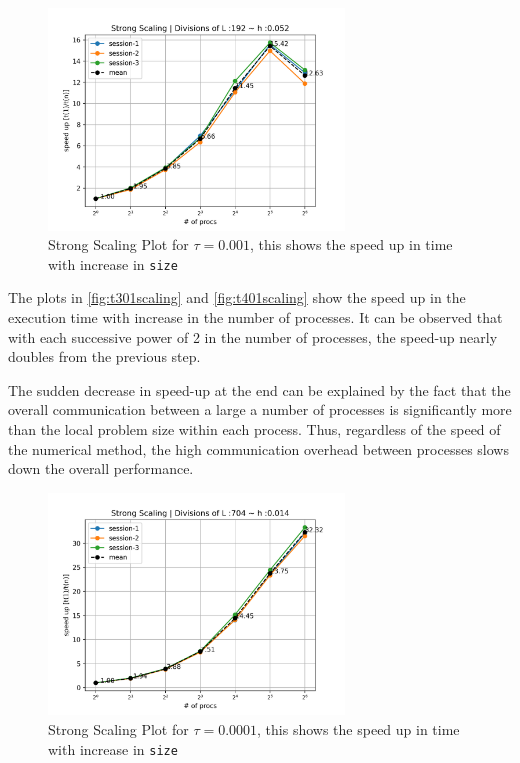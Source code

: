 \begin{figure}[H]
    \centering
    \includegraphics[width=0.7\textwidth]{figures/t301_scaling192-plot.png}
    \caption{Strong Scaling Plot for $\tau=0.001$, this shows the speed up in time with increase in \texttt{size}}
    \label{fig:t301scaling}
\end{figure}
The plots in \autoref{fig:t301scaling} and \autoref{fig:t401scaling} show the speed up in the execution time with increase in the number of processes. It can be observed that with each successive power of 2 in the number of processes, the speed-up nearly doubles from the previous step. 

The sudden decrease in speed-up at the end can be explained by the fact that the overall communication between a large a number of processes is significantly more than the local problem size within each process. Thus, regardless of the speed of the numerical method, the high communication overhead between processes slows down the overall performance.

\begin{figure}[H]
    \centering
    \includegraphics[width=0.7\textwidth]{figures/t401_scaling704-plot.png}
    \caption{Strong Scaling Plot for $\tau=0.0001$, this shows the speed up in time with increase in \texttt{size}}
    \label{fig:t401scaling}
\end{figure}



